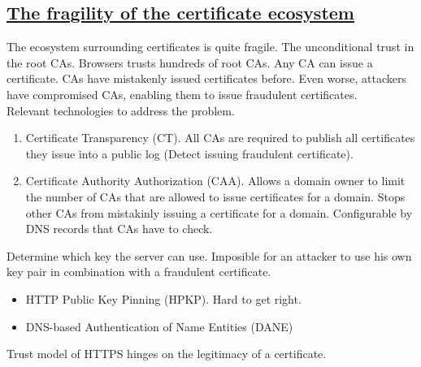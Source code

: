 \documentclass[titlepage]{article}
\begin{document}
    \subsection{\href{https://youtu.be/Rim2-l6mSfw}{The fragility of the certificate ecosystem}}
    The ecosystem surrounding certificates is quite fragile. The unconditional trust in the root CAs. Browsers trusts hundreds of root CAs. Any CA can issue a certificate. CAs have mistakenly issued certificates before. Even worse, attackers have compromised CAs, enabling them to issue fraudulent certificates.\\
    Relevant technologies to address the problem.
    \begin{enumerate}
        \item Certificate Transparency (CT). All CAs are required to publish all certificates they issue into a public log (Detect issuing fraudulent certificate).
        \item Certificate Authority Authorization (CAA). Allows a domain owner to limit the number of CAs that are allowed to issue certificates for a domain. Stops other CAs from mistakinly issuing a certificate for a domain. Configurable by DNS records that CAs have to check.
    \end{enumerate}
    Determine which key the server can use. Imposible for an attacker to use his own key pair in combination with a fraudulent certificate.
    \begin{itemize}
        \item HTTP Public Key Pinning (HPKP). Hard to get right.
        \item DNS-based Authentication of Name Entities (DANE)
    \end{itemize}
    Trust model of HTTPS hinges on the legitimacy of a certificate.
\end{document}
